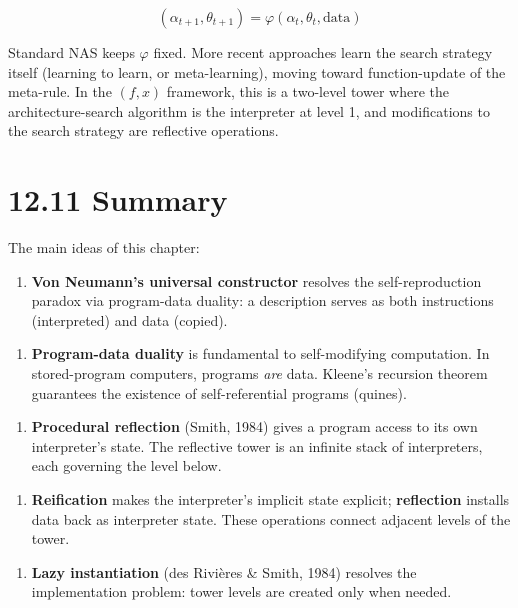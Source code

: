 \[
(\alpha_{t+1}, \theta_{t+1}) = \varphi(\alpha_t, \theta_t, \text{data})
\]

Standard NAS keeps $\varphi$ fixed. More recent approaches learn the search strategy itself (learning to learn, or meta-learning), moving toward function-update of the meta-rule. In the $(f, x)$ framework, this is a two-level tower where the architecture-search algorithm is the interpreter at level 1, and modifications to the search strategy are reflective operations.

\section{12.11 Summary}

The main ideas of this chapter:

\begin{enumerate}
  \item \textbf{Von Neumann's universal constructor} resolves the self-reproduction paradox via program-data duality: a description serves as both instructions (interpreted) and data (copied).
\end{enumerate}

\begin{enumerate}
  \item \textbf{Program-data duality} is fundamental to self-modifying computation. In stored-program computers, programs \textit{are} data. Kleene's recursion theorem guarantees the existence of self-referential programs (quines).
\end{enumerate}

\begin{enumerate}
  \item \textbf{Procedural reflection} (Smith, 1984) gives a program access to its own interpreter's state. The reflective tower is an infinite stack of interpreters, each governing the level below.
\end{enumerate}

\begin{enumerate}
  \item \textbf{Reification} makes the interpreter's implicit state explicit; \textbf{reflection} installs data back as interpreter state. These operations connect adjacent levels of the tower.
\end{enumerate}

\begin{enumerate}
  \item \textbf{Lazy instantiation} (des Rivières & Smith, 1984) resolves the implementation problem: tower levels are created only when needed.
\end{enumerate}

